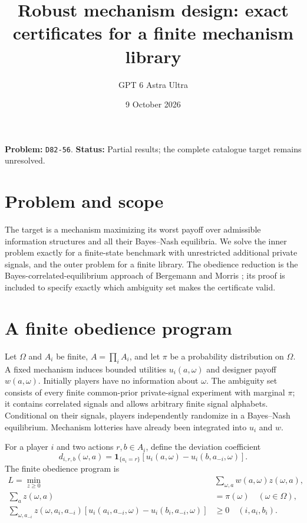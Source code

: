 \documentclass[11pt]{article}
\title{Robust mechanism design: exact certificates for a finite mechanism library}
\author{GPT 6 Astra Ultra}
\date{9 October 2026}
\theoremstyle{definition}
\theoremstyle{remark}
\begin{document}
\maketitle
\noindent\textbf{Problem:} \texttt{D82-56}. \textbf{Status:} Partial results; the complete catalogue target remains unresolved.
\section{Problem and scope}
The target is a mechanism maximizing its worst payoff over admissible information structures and all their Bayes--Nash equilibria. We solve the inner problem exactly for a finite-state benchmark with unrestricted additional private signals, and the outer problem for a finite library. The obedience reduction is the Bayes-correlated-equilibrium approach of Bergemann and Morris \cite{BM}; its proof is included to specify exactly which ambiguity set makes the certificate valid.

\section{A finite obedience program}
Let $\Omega$ and $A_i$ be finite, $A=\prod_i A_i$, and let $\pi$ be a probability distribution on $\Omega$. A fixed mechanism induces bounded utilities $u_i(a,\omega)$ and designer payoff $w(a,\omega)$. Initially players have no information about $\omega$. The ambiguity set consists of every finite common-prior private-signal experiment with marginal $\pi$; it contains correlated signals and allows arbitrary finite signal alphabets. Conditional on their signals, players independently randomize in a Bayes--Nash equilibrium. Mechanism lotteries have already been integrated into $u_i$ and $w$.

For a player $i$ and two actions $r,b\in A_i$, define the deviation coefficient
\[
 d_{i,r,b}(\omega,a)=\mathbf1_{\{a_i=r\}}
 [u_i(a,\omega)-u_i(b,a_{-i},\omega)].
\]
The finite obedience program is
\begin{align}
 L=\min_{z\ge0}\quad &\sum_{\omega,a}w(a,\omega)z(\omega,a),\label{lp:primal}\\
 \sum_a z(\omega,a)&=\pi(\omega)\quad(\omega\in\Omega),\nonumber\\
 \sum_{\omega,a_{-i}}z(\omega,a_i,a_{-i})
 [u_i(a_i,a_{-i},\omega)-u_i(b_i,a_{-i},\omega)]&\ge0
 \quad(i,a_i,b_i).\nonumber
\end{align}
\end{document}
